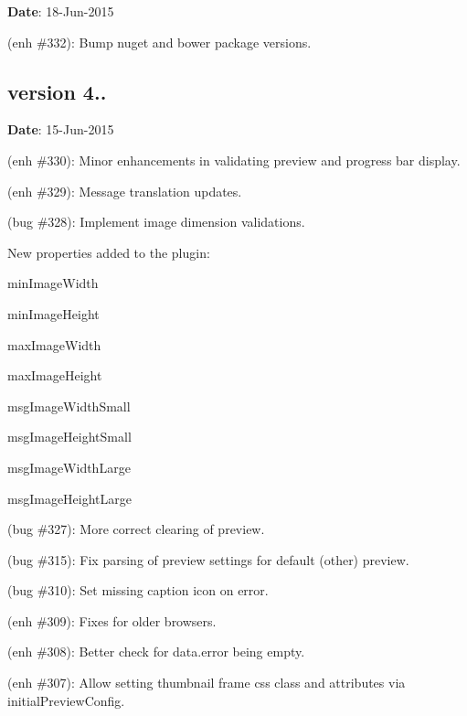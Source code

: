 {\bfseries Date}\+: 18-\/\+Jun-\/2015


\begin{DoxyItemize}
\item (enh \#332)\+: Bump nuget and bower package versions.
\end{DoxyItemize}

\subsection*{version 4..}

{\bfseries Date}\+: 15-\/\+Jun-\/2015


\begin{DoxyItemize}
\item (enh \#330)\+: Minor enhancements in validating preview and progress bar display.
\item (enh \#329)\+: Message translation updates.
\item (bug \#328)\+: Implement image dimension validations.
\begin{DoxyItemize}
\item New properties added to the plugin\+:
\begin{DoxyItemize}
\item {\ttfamily min\+Image\+Width}
\item {\ttfamily min\+Image\+Height}
\item {\ttfamily max\+Image\+Width}
\item {\ttfamily max\+Image\+Height}
\item {\ttfamily msg\+Image\+Width\+Small}
\item {\ttfamily msg\+Image\+Height\+Small}
\item {\ttfamily msg\+Image\+Width\+Large}
\item {\ttfamily msg\+Image\+Height\+Large}
\end{DoxyItemize}
\end{DoxyItemize}
\item (bug \#327)\+: More correct clearing of preview.
\item (bug \#315)\+: Fix parsing of preview settings for default (other) preview.
\item (bug \#310)\+: Set missing caption icon on error.
\item (enh \#309)\+: Fixes for older browsers.
\item (enh \#308)\+: Better check for {\ttfamily data.\+error} being empty.
\item (enh \#307)\+: Allow setting thumbnail frame css class and attributes via {\ttfamily initial\+Preview\+Config}.

\end{DoxyItemize}
